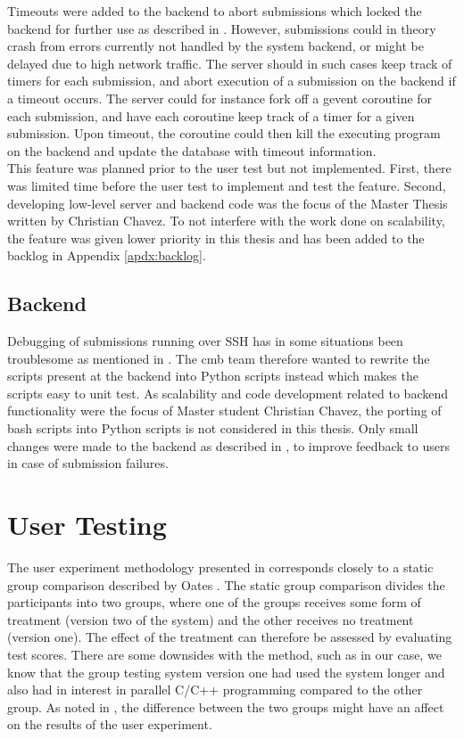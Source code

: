 Timeouts were added to the backend to abort submissions which locked the backend for further use as described in . However, submissions could in theory crash from errors currently not handled by the system backend, or might be delayed due to high network traffic. The server should in such cases keep track of timers for each submission, and abort execution of a submission on the backend if a timeout occurs. The server could for instance fork off a gevent coroutine for each submission, and have each coroutine keep track of a timer for a given submission. Upon timeout, the coroutine could then kill the executing program on the backend and update the database with timeout information. \\

This feature was planned prior to the user test but not implemented. First, there was limited time before the user test to implement and test the feature. Second, developing low-level server and backend code was the focus of the Master Thesis written by Christian Chavez. To not interfere with the work done on scalability, the feature was given lower priority in this thesis and has been added to the backlog in Appendix \ref{apdx:backlog}.

\subsection{Backend}
Debugging of submissions running over SSH has in some situations been troublesome as mentioned in . The \gls{cmb} team therefore wanted to rewrite the scripts present at the backend into Python scripts instead which makes the scripts easy to unit test. As scalability and code development related to backend functionality were the focus of Master student Christian Chavez, the porting of bash scripts into Python scripts is not considered in this thesis. Only small changes were made to the backend as described in , to improve feedback to users in case of submission failures.

\section{User Testing}
\label{sec:eval-user-testing}
The user experiment methodology presented in  corresponds closely to a static group comparison described by Oates \cite{Oates2006}. The static group comparison divides the participants into two groups, where one of the groups receives some form of treatment (version two of the system) and the other receives no treatment (version one). The effect of the treatment can therefore be assessed by evaluating test scores. There are some downsides with the method, such as in our case, we know that the group testing system version one had used the system longer and also had in interest in parallel C/C++ programming compared to the other group. As noted in , the difference between the two groups might have an affect on the results of the user experiment. \\

